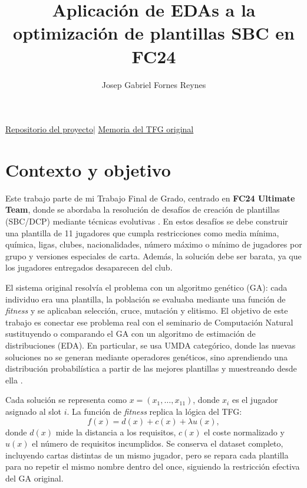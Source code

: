 \documentclass[10pt,a4paper]{article}
\title{\vspace{-1.0cm}\textbf{Aplicación de EDAs a la optimización de plantillas SBC en FC24}\vspace{-0.45cm}}
\author{Josep Gabriel Fornes Reynes}
\date{\vspace{-0.65cm}}
\newcommand{\repoUrl}{https://github.com/PepBiel/eda-fc24-squad-optimizer}
\newcommand{\tfgUrl}{https://github.com/PepBiel/eda-fc24-squad-optimizer/blob/main/Treball_Final_de_Grau_vFinal.pdf}
\begin{document}
\maketitle
\vspace{-0.72cm}
\begin{center}
\footnotesize\href{\repoUrl}{Repositorio del proyecto}\quad $|$ \quad\href{\tfgUrl}{Memoria del TFG original}
\end{center}
\vspace{-0.45cm}

\section{Contexto y objetivo}

Este trabajo parte de mi Trabajo Final de Grado, centrado en \textbf{FC24 Ultimate Team}, donde se abordaba la resolución de desafíos de creación de plantillas (SBC/DCP) mediante técnicas evolutivas \cite{fornes2025}. En estos desafíos se debe construir una plantilla de 11 jugadores que cumpla restricciones como media mínima, química, ligas, clubes, nacionalidades, número máximo o mínimo de jugadores por grupo y versiones especiales de carta. Además, la solución debe ser barata, ya que los jugadores entregados desaparecen del club.

El sistema original resolvía el problema con un algoritmo genético (GA): cada individuo era una plantilla, la población se evaluaba mediante una función de \textit{fitness} y se aplicaban selección, cruce, mutación y elitismo. El objetivo de este trabajo es conectar ese problema real con el seminario de Computación Natural sustituyendo o comparando el GA con un algoritmo de estimación de distribuciones (EDA). En particular, se usa UMDA categórico, donde las nuevas soluciones no se generan mediante operadores genéticos, sino aprendiendo una distribución probabilística a partir de las mejores plantillas y muestreando desde ella \cite{muhlenbein1996,larranaga2012,seminario}.

Cada solución se representa como $x=(x_1,\ldots,x_{11})$, donde $x_i$ es el jugador asignado al slot $i$. La función de \textit{fitness} replica la lógica del TFG:
\[
    f(x)=d(x)+c(x)+\lambda u(x),
\]
donde $d(x)$ mide la distancia a los requisitos, $c(x)$ el coste normalizado y $u(x)$ el número de requisitos incumplidos. Se conserva el dataset completo, incluyendo cartas distintas de un mismo jugador, pero se repara cada plantilla para no repetir el mismo nombre dentro del once, siguiendo la restricción efectiva del GA original.
\end{document}
